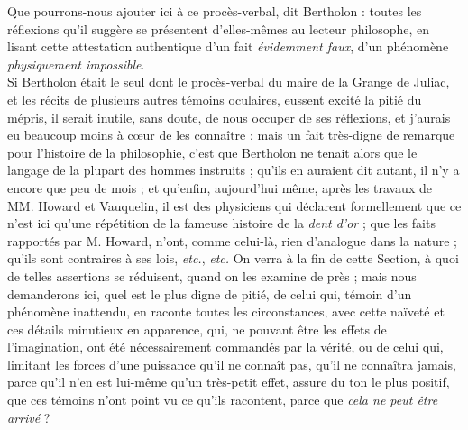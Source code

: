 \documentclass[a4paper, 11pt, oneside, polutonikogreek, french]{article}
\begin{document}
{\hspace*{5mm}\og Que pourrons-nous ajouter ici à ce procès-verbal, dit Bertholon : toutes les réflexions qu'il suggère se présentent d'elles-mêmes au lecteur philosophe, en lisant cette attestation authentique d'un fait \emph{évidemment faux}, d'un phénomène \emph{physiquement impossible}. \fg \\
\hspace*{5mm}Si Bertholon était le seul dont le procès-verbal du maire de la Grange de Juliac, et les récits de plusieurs autres témoins oculaires, eussent excité la pitié du mépris, il serait inutile, sans doute, de nous occuper de ses réflexions, et j'aurais eu beaucoup moins à cœur de les connaître ; mais un fait très-digne de remarque pour l'histoire de la philosophie, c'est que Bertholon ne tenait alors que le langage de la plupart des hommes instruits ; qu'ils en auraient dit autant, il n'y a encore que peu de mois ; et qu'enfin, aujourd'hui même, après les travaux de MM. Howard et Vauquelin, il est des physiciens qui déclarent formellement que ce n'est ici qu'une répétition de la fameuse histoire de la \emph{dent d'or} ; que les faits rapportés par M. Howard, n'ont, comme celui-là, rien d'analogue dans la nature ; qu'ils sont contraires à ses lois, \emph{etc.}, \emph{etc.} On verra à la fin de cette Section, à quoi de telles assertions se réduisent, quand on les examine de près ; mais nous demanderons ici, quel est le plus digne de pitié, de celui qui, témoin d'un phénomène inattendu, en raconte toutes les circonstances, avec cette naïveté et ces détails minutieux en apparence, qui, ne pouvant être les effets de l'imagination, ont été nécessairement commandés par la vérité, ou de celui qui, limitant les forces d'une puissance qu'il ne connaît pas, qu'il ne connaîtra jamais, parce qu'il n'en est lui-même qu'un très-petit effet, assure du ton le plus positif, que ces témoins n'ont point vu ce qu'ils racontent, parce que \emph{cela ne peut être arrivé} ?\\
}
\end{document}
